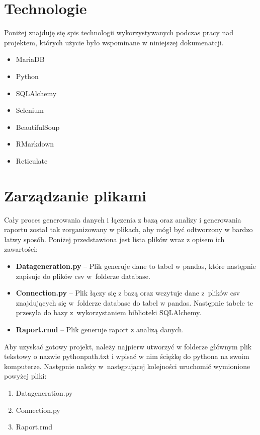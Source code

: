 \documentclass{article}
\begin{document}
	
	\section{Technologie}
	Poniżej znajduję się spis technologii wykorzystywanych podczas pracy nad projektem, których użycie było wspominane w niniejszej dokumenatcji.
	\begin{itemize}
		\setlength{\itemsep}{-2pt}
		\item MariaDB
		\item Python
		\item SQLAlchemy
		\item Selenium
		\item BeautifulSoup
		\item RMarkdown
		\item Reticulate
	\end{itemize}
	
	
	
	\section{Zarządzanie plikami}
	Cały proces generowania danych i łączenia z bazą oraz analizy i generowania raportu został tak zorganizowany w plikach, aby mógł być odtworzony w bardzo łatwy sposób. Poniżej przedstawiona jest lista plików wraz z opisem ich zawartości:
	\begin{itemize}
		\setlength{\itemsep}{-2pt}
		\item \textbf{Data\textunderscore generation.py} – Plik generuje dane to tabel w pandas, które następnie zapisuje do plików csv w~folderze database.
		\item \textbf{Connection.py} – Plik łączy się z bazą oraz wczytuje dane z~plików csv znajdujących się w~folderze database do tabel w pandas.
		Następnie tabele te przesyła do bazy z~wykorzystaniem biblioteki SQLAlchemy.
		\item \textbf{Raport.rmd} – Plik generuje raport z analizą danych.	
	\end{itemize}
	
	
	\noindent Aby uzyskać gotowy projekt, należy najpierw utworzyć w folderze głównym plik tekstowy o nazwie python\textunderscore path.txt i wpisać w nim ściężkę do pythona na swoim komputerze. Następnie należy w~następującej kolejności uruchomić wymionione powyżej pliki:
	\begin{enumerate}
		\setlength{\itemsep}{-2pt}
		\item Data\textunderscore generation.py
		\item Connection.py
		\item Raport.rmd
	\end{enumerate}
	
\end{document}

